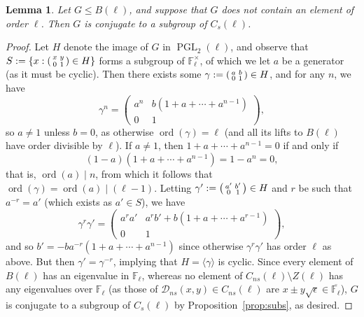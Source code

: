 \documentclass[table,dvipsnames]{amsart}
\newcommand{\F}{\mathbb{F}}
\newcommand{\PGL}{\operatorname{PGL}}
\newcommand{\angles}[1]{\langle #1\rangle}
\newcommand{\ord}{\operatorname{ord}}
\newcommand{\smallmat}[4]{\begin{psmallmatrix}#1&#2\\#3&#4\end{psmallmatrix}}
\newtheorem{lemma}[theorem]{Lemma}
\numberwithin{equation}{section}
\newcommand{\s}{\textit{s}}
\newcommand{\ns}{\textit{ns}}
\newcommand{\Cs}{C_\s}
\newcommand{\Cns}{C_\ns}
\begin{document}
\begin{lemma}
\label{lem:borelsubgp}
Let $G\le B(\ell)$, and suppose that $G$ does not contain an element of order $\ell$. Then $G$ is conjugate to a subgroup of $\Cs(\ell)$.
\end{lemma}
\begin{proof}
Let $H$ denote the image of $G$ in $\PGL_2(\ell)$, and observe that $S:=\{x:\smallmat{x}{y}{0}{1}\in H\}$ forms a subgroup of $\F_\ell^\times$, of which we let $a$ be a generator (as it must be cyclic). Then there exists some $\gamma:=\smallmat{a}{b}{0}{1}\in H$, and for any $n$, we have
\begin{equation*}
\gamma^n=\begin{pmatrix}a^n&b(1+a+\cdots+a^{n-1})\\0&1\end{pmatrix},
\end{equation*}
so $a\ne 1$ unless $b=0$, as otherwise $\ord(\gamma)=\ell$ (and all its lifts to $B(\ell)$ have order divisible by $\ell$). If $a\ne 1$, then $1+a+\cdots+a^{n-1}=0$ if and only if
\begin{equation*}
(1-a)(1+a+\cdots+a^{n-1})=1-a^n=0,
\end{equation*}
that is, $\ord(a)\mid n$, from which it follows that $\ord(\gamma)=\ord(a)\mid (\ell-1)$. Letting $\gamma':=\smallmat{a'}{b'}{0}{1}\in H$ and $r$ be such that $a^{-r}=a'$ (which exists as $a'\in S$), we have
\begin{equation*}
\gamma^r\gamma'=\begin{pmatrix}a^ra'&a^rb'+b(1+a+\cdots+a^{r-1})\\0&1\end{pmatrix},
\end{equation*}
and so $b'=-ba^{-r}(1+a+\cdots+a^{n-1})$ since otherwise $\gamma^r\gamma'$ has order $\ell$ as above. But then $\gamma'=\gamma^{-r}$, implying that $H=\angles{\gamma}$ is cyclic. Since every element of $B(\ell)$ has an eigenvalue in $\F_\ell$, whereas no element of $\Cns(\ell)\setminus Z(\ell)$ has any eigenvalues over $\F_\ell$ (as those of $\mathcal{D}_\ns(x,y)\in\Cns(\ell)$ are $x\pm y\sqrt{\epsilon}\in\overline{\F_\ell}$), $G$ is conjugate to a subgroup of $\Cs(\ell)$ by Proposition~\ref{prop:subs}, as desired.
\end{proof}
\end{document}
